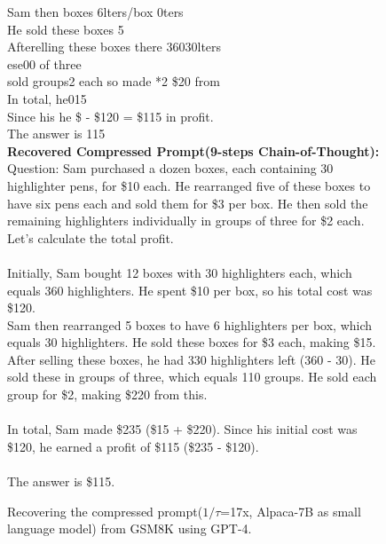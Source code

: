 \begin{figure*}[htb]
\begin{tcolorbox}
    Sam then boxes 6lters/box 0ters\\
    He sold these boxes 5\\
    Afterelling these boxes there 36030lters\\
    ese00 of three\\
     sold groups2 each so made *2 \$20 from\\
    In total, he015\\
    Since his he \$ - \$120 = \$115 in profit.\\
    The answer is 115\\
    \textbf{Recovered Compressed Prompt(9-steps Chain-of-Thought):}\\
    Question: Sam purchased a dozen boxes, each containing 30 highlighter pens, for \$10 each. He rearranged five of these boxes to have six pens each and sold them for \$3 per box. He then sold the remaining highlighters individually in groups of three for \$2 each. Let's calculate the total profit.\\
    \\
    Initially, Sam bought 12 boxes with 30 highlighters each, which equals 360 highlighters. He spent \$10 per box, so his total cost was \$120.\\
    Sam then rearranged 5 boxes to have 6 highlighters per box, which equals 30 highlighters. He sold these boxes for \$3 each, making \$15.\\
    After selling these boxes, he had 330 highlighters left (360 - 30). He sold these in groups of three, which equals 110 groups. He sold each group for \$2, making \$220 from this.\\
    \\
    In total, Sam made \$235 (\$15 + \$220). Since his initial cost was \$120, he earned a profit of \$115 (\$235 - \$120).\\
    \\
    The answer is \$115.
    \end{tcolorbox}
    \caption{Recovering the compressed prompt($1/\tau$=17x, Alpaca-7B as small language model) from GSM8K using GPT-4.}
    \label{fig:prompt_recovered}
\end{figure*}

